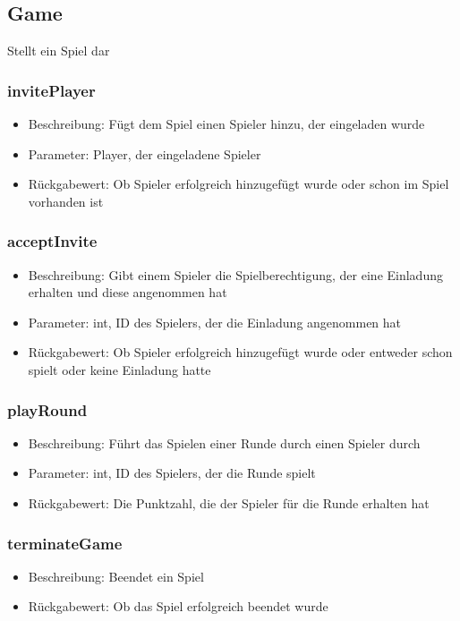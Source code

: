 \documentclass[a4paper]{scrreprt}
\begin{document}
	\subsection{Game}
	Stellt ein Spiel dar
	\subsubsection{invitePlayer}
	\begin{itemize}
		\item Beschreibung: Fügt dem Spiel einen Spieler hinzu, der eingeladen wurde
		\item Parameter: Player, der eingeladene Spieler
		\item Rückgabewert: Ob Spieler erfolgreich hinzugefügt wurde oder schon im Spiel vorhanden ist
	\end{itemize}
	\subsubsection{acceptInvite}
	\begin{itemize}
		\item Beschreibung: Gibt einem Spieler die Spielberechtigung, der eine Einladung erhalten und diese angenommen hat
		\item Parameter: int, ID des Spielers, der die Einladung angenommen hat
		\item Rückgabewert: Ob Spieler erfolgreich hinzugefügt wurde oder entweder schon spielt oder keine Einladung hatte
	\end{itemize}
	\subsubsection{playRound}
	\begin{itemize}
		\item Beschreibung: Führt das Spielen einer Runde durch einen Spieler durch
		\item Parameter: int, ID des Spielers, der die Runde spielt
		\item Rückgabewert: Die Punktzahl, die der Spieler für die Runde erhalten hat
	\end{itemize}
	\subsubsection{terminateGame}
	\begin{itemize}
		\item Beschreibung: Beendet ein Spiel
		\item Rückgabewert: Ob das Spiel erfolgreich beendet wurde
	\end{itemize}
\end{document}
